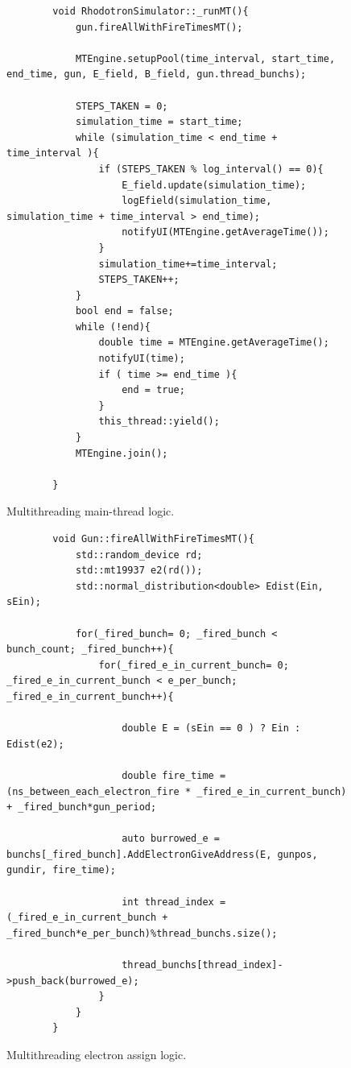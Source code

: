 \documentclass{book}
\begin{document}
\begin{figure}[H]
    \centering
    \captionsetup{justification=centering}
    \begin{verbatim}
        void RhodotronSimulator::_runMT(){
            gun.fireAllWithFireTimesMT();
        
            MTEngine.setupPool(time_interval, start_time, end_time, gun, E_field, B_field, gun.thread_bunchs);
        
            STEPS_TAKEN = 0;
            simulation_time = start_time;
            while (simulation_time < end_time + time_interval ){
                if (STEPS_TAKEN % log_interval() == 0){
                    E_field.update(simulation_time);
                    logEfield(simulation_time, simulation_time + time_interval > end_time);
                    notifyUI(MTEngine.getAverageTime());
                }
                simulation_time+=time_interval;
                STEPS_TAKEN++;
            }
            bool end = false;
            while (!end){
                double time = MTEngine.getAverageTime();
                notifyUI(time);
                if ( time >= end_time ){
                    end = true;
                }
                this_thread::yield();
            }
            MTEngine.join();
            
        }
    \end{verbatim}
    \caption{Multithreading main-thread logic.}
    \label{fig:_runMT}
\end{figure}

\begin{figure}[H]
    \centering
    \captionsetup{justification=centering}
    \begin{verbatim}
        void Gun::fireAllWithFireTimesMT(){
            std::random_device rd;
            std::mt19937 e2(rd());
            std::normal_distribution<double> Edist(Ein, sEin);
    
            for(_fired_bunch= 0; _fired_bunch < bunch_count; _fired_bunch++){
                for(_fired_e_in_current_bunch= 0; _fired_e_in_current_bunch < e_per_bunch; _fired_e_in_current_bunch++){
    
                    double E = (sEin == 0 ) ? Ein : Edist(e2);
    
                    double fire_time = (ns_between_each_electron_fire * _fired_e_in_current_bunch) + _fired_bunch*gun_period;
    
                    auto burrowed_e = bunchs[_fired_bunch].AddElectronGiveAddress(E, gunpos, gundir, fire_time);
    
                    int thread_index = (_fired_e_in_current_bunch + _fired_bunch*e_per_bunch)%thread_bunchs.size();
    
                    thread_bunchs[thread_index]->push_back(burrowed_e);
                }
            }
        }
    \end{verbatim}
    \caption{Multithreading electron assign logic.}
    \label{fig:fireAllWithFireTimesMT}
\end{figure}
\end{document}
